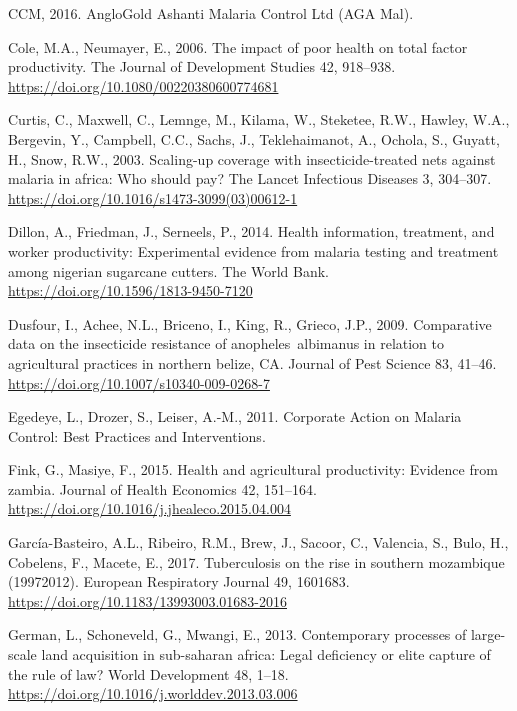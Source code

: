 \documentclass[]{article}
\begin{document}
\hypertarget{ref-anglo}{}
CCM, 2016. AngloGold Ashanti Malaria Control Ltd (AGA Mal).

\hypertarget{ref-Cole2006}{}
Cole, M.A., Neumayer, E., 2006. The impact of poor health on total
factor productivity. The Journal of Development Studies 42, 918--938.
\url{https://doi.org/10.1080/00220380600774681}

\hypertarget{ref-Curtis2003}{}
Curtis, C., Maxwell, C., Lemnge, M., Kilama, W., Steketee, R.W., Hawley,
W.A., Bergevin, Y., Campbell, C.C., Sachs, J., Teklehaimanot, A.,
Ochola, S., Guyatt, H., Snow, R.W., 2003. Scaling-up coverage with
insecticide-treated nets against malaria in africa: Who should pay? The
Lancet Infectious Diseases 3, 304--307.
\url{https://doi.org/10.1016/s1473-3099(03)00612-1}

\hypertarget{ref-Dillon2014}{}
Dillon, A., Friedman, J., Serneels, P., 2014. Health information,
treatment, and worker productivity: Experimental evidence from malaria
testing and treatment among nigerian sugarcane cutters. The World Bank.
\url{https://doi.org/10.1596/1813-9450-7120}

\hypertarget{ref-Dusfour2009}{}
Dusfour, I., Achee, N.L., Briceno, I., King, R., Grieco, J.P., 2009.
Comparative data on the insecticide resistance of anopheles~albimanus in
relation to agricultural practices in northern belize, CA. Journal of
Pest Science 83, 41--46. \url{https://doi.org/10.1007/s10340-009-0268-7}

\hypertarget{ref-lafarge}{}
Egedeye, L., Drozer, S., Leiser, A.-M., 2011. Corporate Action on
Malaria Control: Best Practices and Interventions.

\hypertarget{ref-Fink2015}{}
Fink, G., Masiye, F., 2015. Health and agricultural productivity:
Evidence from zambia. Journal of Health Economics 42, 151--164.
\url{https://doi.org/10.1016/j.jhealeco.2015.04.004}

\hypertarget{ref-GarcaBasteiro2017}{}
García-Basteiro, A.L., Ribeiro, R.M., Brew, J., Sacoor, C., Valencia,
S., Bulo, H., Cobelens, F., Macete, E., 2017. Tuberculosis on the rise
in southern mozambique (19972012). European Respiratory Journal 49,
1601683. \url{https://doi.org/10.1183/13993003.01683-2016}

\hypertarget{ref-German2013}{}
German, L., Schoneveld, G., Mwangi, E., 2013. Contemporary processes of
large-scale land acquisition in sub-saharan africa: Legal deficiency or
elite capture of the rule of law? World Development 48, 1--18.
\url{https://doi.org/10.1016/j.worlddev.2013.03.006}
\end{document}
